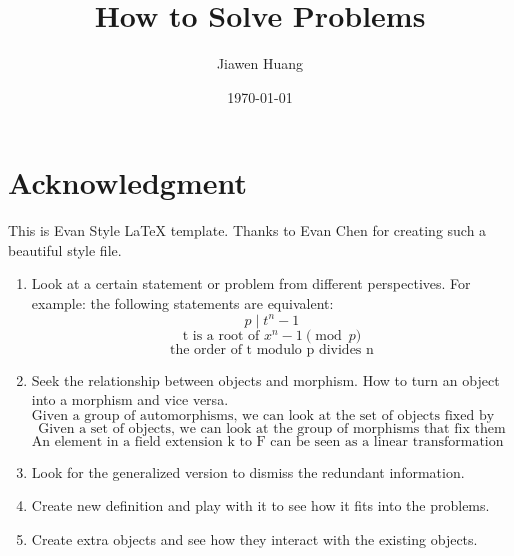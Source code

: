 \documentclass[15pt]{scrartcl}
\begin{document}
\title{How to Solve Problems}
\date{\today}
\author{Jiawen Huang}
\maketitle

\newpage


\section{Acknowledgment}
This is Evan Style LaTeX template. Thanks to Evan Chen for creating such a beautiful style file.
\newpage 
\begin{enumerate}
    \item Look at a certain statement or problem from different perspectives. For example: the following statements are equivalent:
    \[p\mid t^n-1\]
    \[\text{t is a root of } x^n-1 \pmod{p}\]
    \[\text{the order of t modulo p divides n}\]
    \item Seek the relationship between objects and morphism. How to turn an object into a morphism and vice versa.
    \[\text{Given a group of automorphisms, we can look at the set of objects fixed by the morphism}\]
    \[\text{Given a set of objects, we can look at the group of morphisms that fix them}\]
    \[\text{An element in a field extension k to F can be seen as a linear transformation of F vector space over k}\]
    \item Look for the generalized version to dismiss the redundant information.
    \item Create new definition and play with it to see how it fits into the problems.
    \item Create extra objects and see how they interact with the existing objects. 
\end{enumerate}
\end{document}
